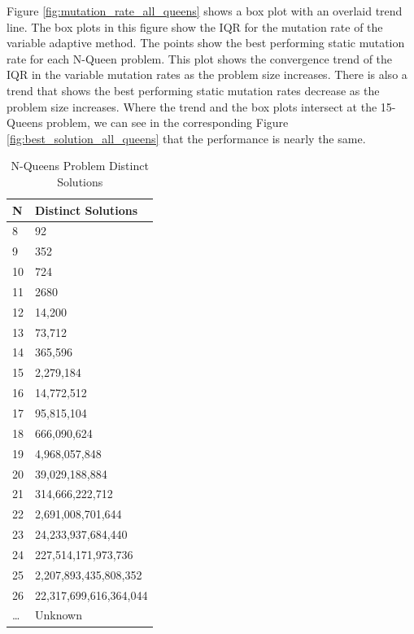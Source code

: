 \documentclass[conference]{IEEEtran}
\begin{document}
Figure \ref{fig:mutation_rate_all_queens} shows a box plot with an overlaid trend line. The box plots in this figure show the IQR for the mutation rate of the variable adaptive method. The points show the best performing static mutation rate for each N-Queen problem. This plot shows the convergence trend of the IQR in the variable mutation rates as the problem size increases. There is also a trend that shows the best performing static mutation rates decrease as the problem size increases. Where the trend and the box plots intersect at the 15-Queens problem, we can see in the corresponding Figure \ref{fig:best_solution_all_queens} that the performance is nearly the same.


% 
%
\begin{table}
\centering
\caption{N-Queens Problem Distinct Solutions}
\begin{tabular}{|l|l|} \hline
N & Distinct Solutions      \\ \hline
8  & 92                     \\
9  & 352                    \\
10 & 724                    \\
11 & 2680                   \\
12 & 14,200                 \\
13 & 73,712                 \\
14 & 365,596                \\
15 & 2,279,184              \\
16 & 14,772,512             \\
17 & 95,815,104             \\
18 & 666,090,624            \\
19 & 4,968,057,848          \\
20 & 39,029,188,884         \\
21 & 314,666,222,712        \\
22 & 2,691,008,701,644      \\
23 & 24,233,937,684,440     \\
24 & 227,514,171,973,736    \\
25 & 2,207,893,435,808,352  \\
26 & 22,317,699,616,364,044 \\
\dots & Unknown				\\
\hline\end{tabular}
\label{table:numuniquesol}
\end{table}
\end{document}
